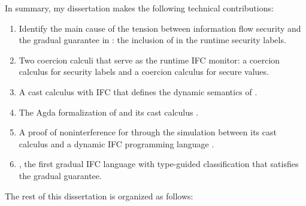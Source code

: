 {\color{NavyBlue} %
In summary, my dissertation makes the following technical contributions:

\begin{enumerate}
\item Identify the main cause of the tension between information flow security
  and the gradual guarantee in \GSLRef: the inclusion of \unk in the runtime
  security labels.
\item Two coercion calculi that serve as the runtime IFC monitor: a coercion
  calculus for security labels and a coercion calculus for secure values.
\item A cast calculus \CC with IFC that defines the dynamic semantics of
  \Surface.
\item The Agda formalization of \Surface and its cast calculus \CC.
\item A proof of noninterference for \Surface through the simulation between its
  cast calculus \CC and a dynamic IFC programming language \DynIFC.
\item \Surface, the first gradual IFC language with type-guided
  classification that satisfies the gradual guarantee.
\end{enumerate}

The rest of this dissertation is organized as follows:

}
